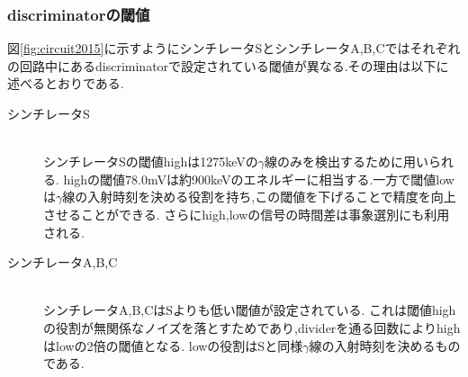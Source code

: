 \subsubsection{discriminatorの閾値}
図\ref{fig:circuit2015}に示すようにシンチレータSとシンチレータA,B,Cではそれぞれの回路中にあるdiscriminatorで設定されている閾値が異なる.その理由は以下に述べるとおりである.
\begin{description}
	\item[シンチレータS]\mbox{}\\
		シンチレータSの閾値highは1275keVの$\gamma$線のみを検出するために用いられる.
		highの閾値78.0mVは約900keVのエネルギーに相当する.一方で閾値lowは$\gamma$線の入射時刻を決める役割を持ち,この閾値を下げることで精度を向上させることができる.
		さらにhigh,lowの信号の時間差は事象選別にも利用される.
	\item[シンチレータA,B,C]\mbox{}\\
		シンチレータA,B,CはSよりも低い閾値が設定されている.
		これは閾値highの役割が無関係なノイズを落とすためであり,dividerを通る回数によりhighはlowの2倍の閾値となる.
		lowの役割はSと同様$\gamma$線の入射時刻を決めるものである.
\end{description}


